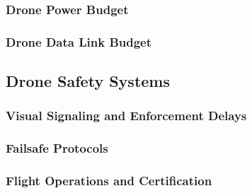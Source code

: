 \subsubsection{Drone Power Budget}
\label{subsubsec:drone_power_budget}


\subsubsection{Drone Data Link Budget}
\label{subsubsec:drone_data_link_budget}


\subsection{Drone Safety Systems}
\label{subsec:drone_safety_systems}

\subsubsection{Visual Signaling and Enforcement Delays}
\label{subsubsec:visual_signaling_enforcement_delays}


\subsubsection{Failsafe Protocols}
\label{subsubsec:failsafe_protocols}


\subsubsection{Flight Operations and Certification}
\label{subsubsec:flight_operations_certification}

